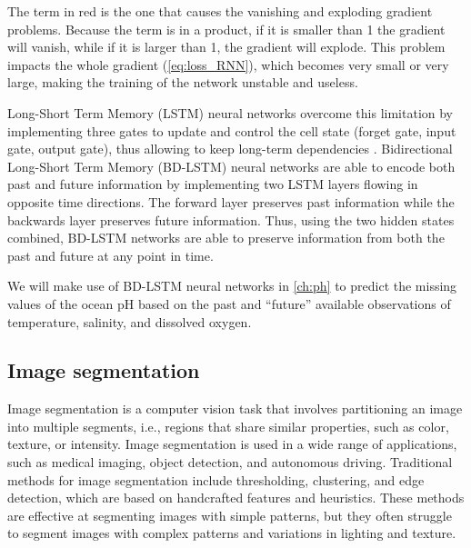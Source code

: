 The term in red is the one that causes the vanishing and exploding gradient
problems. Because the term is in a product, if it is smaller than 1 the
gradient will vanish, while if it is larger than 1, the gradient will
explode.
This problem impacts the whole gradient (\cref{eq:loss_RNN}), which
becomes very small or very large, making the training of the network unstable
and useless.

Long-Short Term Memory (LSTM) neural networks overcome this limitation by
implementing three gates to update and control the cell state (forget gate,
input gate, output gate), thus allowing to keep long-term dependencies
\cite{LSTM_NN}. Bidirectional Long-Short Term Memory (BD-LSTM) neural
networks are able to encode both past and future information by implementing
two LSTM layers flowing in opposite time directions. The forward layer
preserves past information while the backwards layer preserves future
information. Thus, using the two hidden states combined, BD-LSTM networks are
able to preserve information from both the past and future at any point in
time.

We will make use of BD-LSTM neural networks in \cref{ch:ph} to predict the
missing values of the ocean pH based on the past and ``future'' available
observations of temperature, salinity, and dissolved oxygen.


\subsection{\label{sec: Image segmentation} Image segmentation}

Image segmentation is a computer vision task that involves partitioning an
image into multiple segments, i.e., regions that share similar properties,
such
as color, texture, or intensity. Image segmentation is used in a wide range
of
applications, such as medical imaging, object detection, and autonomous
driving. Traditional methods for image segmentation include thresholding,
clustering, and edge detection, which are based on handcrafted features and
heuristics. These methods are effective at segmenting images with simple
patterns, but they often struggle to segment images with complex patterns and
variations in lighting and texture.

